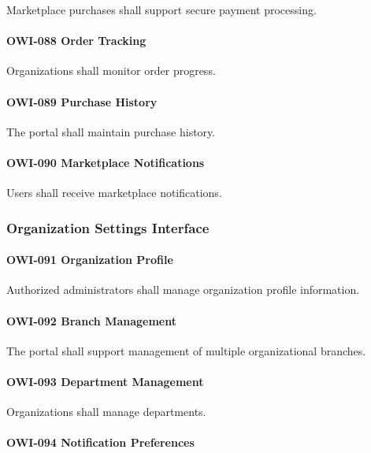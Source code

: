 Marketplace purchases shall support secure payment processing.

\paragraph{OWI-088 Order Tracking}

Organizations shall monitor order progress.

\paragraph{OWI-089 Purchase History}

The portal shall maintain purchase history.

\paragraph{OWI-090 Marketplace Notifications}

Users shall receive marketplace notifications.


\subsubsection*{Organization Settings Interface}

\paragraph{OWI-091 Organization Profile}

Authorized administrators shall manage organization profile
information.

\paragraph{OWI-092 Branch Management}

The portal shall support management of multiple organizational
branches.

\paragraph{OWI-093 Department Management}

Organizations shall manage departments.

\paragraph{OWI-094 Notification Preferences}

